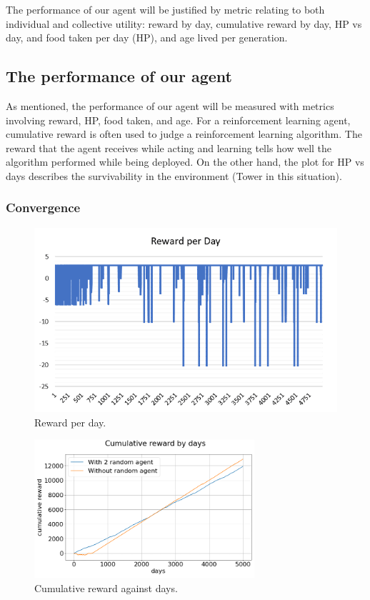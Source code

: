 The performance of our agent will be justified by metric relating to both individual and collective utility: reward by day, cumulative reward by day, HP vs day, and food taken per day (HP), and age lived per generation.

\subsection{The performance of our agent}
As mentioned, the performance of our agent will be measured with metrics involving reward, HP, food taken, and age. For a reinforcement learning agent, cumulative reward is often used to judge a reinforcement learning algorithm. The reward that the agent receives while acting and learning tells how well the algorithm performed while being deployed. On the other hand, the plot for HP vs days describes the survivability in the environment (Tower in this situation).
\subsubsection{Convergence}
\begin{figure}
\centering
\includegraphics{004_team_2_agent_design/rewardperday}
\caption{Reward per day.}
\label{rewday-team2}
\end{figure}

\begin{figure}
\centering
\includegraphics{004_team_2_agent_design/cumrewardbydays}
\caption{Cumulative reward against days.}
\label{cumday-team2}
\end{figure}

